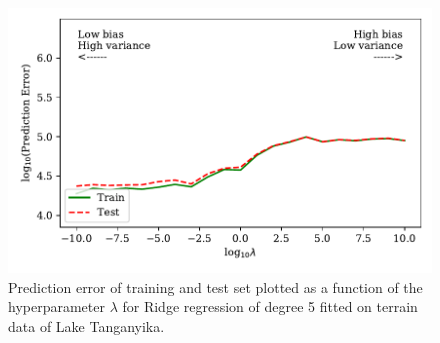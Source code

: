 \documentclass[a4paper, 10pt]{article}
\begin{document}
\begin{figure}[H]
    \includegraphics{figs/biasvariancetradeoff_Ridge_terrain.pdf}
    \caption{Prediction error of training and test set plotted as a function of the hyperparameter $\lambda$ for Ridge regression of degree 5 fitted on terrain data of Lake Tanganyika.}
    \label{fig:bias_ridge_terrain}
\end{figure}
\end{document}
